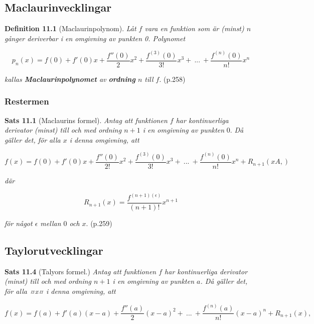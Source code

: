 \documentclass[11pt]{article}
\begin{document}
\subsection{Maclaurinvecklingar}

\textbf{Definition 11.1} (Maclaurinpolynom). \textit{Låt $f$ vara en funktion som är (minst) $n$ gånger deriverbar i en omgivning av punkten 0. Polynomet}

\begin{equation}
    p_n(x) = f(0) + f'(0)x + \frac{f''(0)}{2}x^2 + \frac{f^{(3)}(0)}{3!}x^3 +\ ...\ + \frac{f^{(n)}(0)}{n!}x^n
    \label{eq:maclaurinpolynom}
\end{equation}

\textit{kallas \textbf{Maclaurinpolynomet} av \textbf{ordning} $n$ till $f$}. (p.258)

\subsubsection{Restermen}

\textbf{Sats 11.1} (Maclaurins formel). \textit{Antag att funktionen $f$ har kontinuerliga derivator (minst) till och med ordning $n + 1$ i en omgivning av punkten} 0. \textit{Då gäller det, för alla $x$ i denna omgivning, att}

\begin{equation}
    f(x) = f(0) + f'(0)x + \frac{f''(0)}{2!}x^2 + \frac{f^{(3)}(0)}{3!}x^3 +\ ...\ + \frac{f^{(n)}(0)}{n!}x^n + R_{n + 1}(xA,)
    \label{eq:maclaurinpolynom_och_rest}
\end{equation}

\textit{där}


\begin{equation}
    R_{n + 1}(x) = \frac{f^{(n + 1)(\epsilon)}}{(n +  1)!}x^{n + 1}
    \label{eq:maclaurinpolynom_rest}
\end{equation}

\textit{för något $\epsilon$ mellan $0$ och $x$}. (p.259)

\subsection{Taylorutvecklingar}

\textbf{Sats 11.4} (Talyors formel.) \textit{Antag att funktionen $f$ har kontinuerliga derivator (minst) till och med ordning $n + 1$ i en omgivning av punkten $a$. Då gäller det, för alla ¤x¤ i denna omgivning, att}

\begin{equation}
    f(x) = f(a) + f'(a)(x - a) + \frac{f''(a)}{2}(x - a)^2 +\ ...\ + \frac{f^{(n)}(a)}{n!}(x - a)^n + R_{n + 1}(x),
\end{equation}
\end{document}
